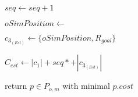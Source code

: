 \begin{algorithm}[H]
\begin{algorithmic}[1]
          \State $seq \gets seq + 1$

          \State {} 

          \State $oSimPosition \gets $

          \State $c_{3_{(Est)}} \gets \{oSimPosition, R_{goal}\}$

          \State $C_{est} \gets |c_{1}| + seq * $$ + |c_{3_{(Est)}}|$

          \State {}

        \EndWhile

      \EndFor

    \State return $p \in P_{o,m}$ with minimal $p.cost$

    \EndProcedure

  \end{algorithmic}
\end{algorithm}
